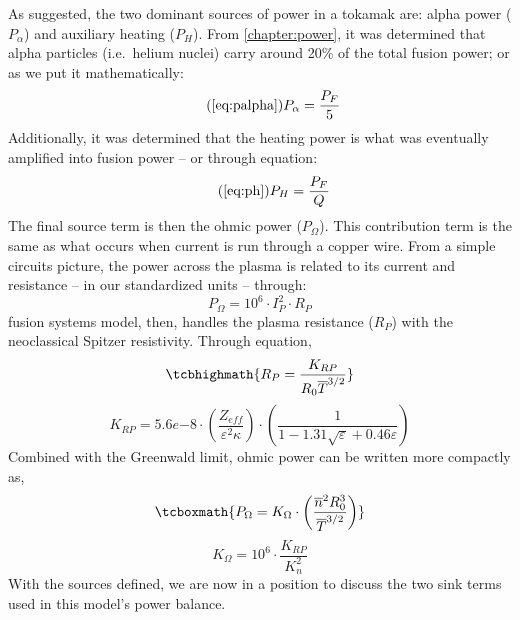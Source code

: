 As suggested, the two dominant sources of power in a tokamak are: alpha power ($P_\alpha$) and auxiliary heating ($P_H$). From \cref{chapter:power}, it was determined that alpha particles (i.e.\ helium nuclei) carry around 20\% of the total fusion power; or as we put it mathematically:
\begin{equation}
	\tag{\ref{eq:palpha}}
	P_\alpha = \frac{P_F}{5}
\end{equation}
Additionally, it was determined that the heating power is what was eventually amplified into fusion power -- or through equation:
\begin{equation}
	\tag{\ref{eq:ph}}
	P_H = \frac{P_F}{Q}
\end{equation}
The final source term is then the ohmic power ($P_\Omega$). This contribution term is the same as what occurs when current is run through a copper wire. From a simple circuits picture, the power across the plasma is related to its current and resistance -- in our standardized units -- through:\cite{process}
\begin{equation}
	\label{eq:pohmic_basic}
	P_\Omega = 10^6 \cdot I_P^2 \cdot R_P
\end{equation}
 fusion systems model, then, handles the plasma resistance ($R_P$)  with the neoclassical Spitzer resistivity. Through equation,
\begin{equation}
	\label{eq:rp}
	\tcbhighmath{
	R_P = \frac{K_{RP}}{R_0 \overline T ^ {3/2}}
	}
\end{equation}
\begin{equation}
	K_{RP} = 5.6e{-8} \cdot \left( \frac{ Z_{eff} }{ \varepsilon^2 \kappa } \right) \cdot \left( \frac{1}{ 1 - 1.31 \sqrt{ \varepsilon } + 0.46 \varepsilon } \right)
\end{equation}
Combined with the Greenwald limit, ohmic power can be written more compactly as,
\begin{equation}
	\label{eq:pohmic}
	\tcboxmath{
	P_\Omega = K_\Omega \cdot \left( \frac{ \overline n ^ 2 R_0^3 }{\overline T ^ {3/2}} \right)
	}
\end{equation}
\begin{equation}
	K_\Omega = 10^6 \cdot \frac{K_{RP}}{K_n^2}
\end{equation}
With the sources defined, we are now in a position to discuss the two sink terms used in this model's power balance.

